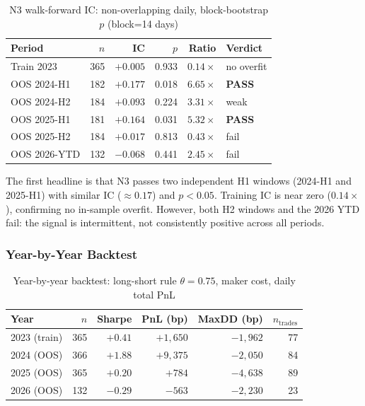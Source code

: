 \documentclass[12pt, a4paper]{article}
\theoremstyle{definition}
\begin{document}
\begin{table}[ht]
\centering
\caption{N3 walk-forward IC: non-overlapping daily, block-bootstrap $p$ (block=14 days)}
\label{tab:n3_walkforward}
\begin{tabular}{lrrrrl}
\toprule
Period & $n$ & IC & $p$ & Ratio & Verdict \\
\midrule
Train 2023     & 365 & $+0.005$ & 0.933 & $0.14\times$ & no overfit \\
OOS 2024-H1    & 182 & $+0.177$ & 0.018 & $6.65\times$ & \textbf{PASS} \\
OOS 2024-H2    & 184 & $+0.093$ & 0.224 & $3.31\times$ & weak \\
OOS 2025-H1    & 181 & $+0.164$ & 0.031 & $5.32\times$ & \textbf{PASS} \\
OOS 2025-H2    & 184 & $+0.017$ & 0.813 & $0.43\times$ & fail \\
OOS 2026-YTD   & 132 & $-0.068$ & 0.441 & $2.45\times$ & fail \\
\bottomrule
\end{tabular}
\end{table}

The first headline is that N3 passes two independent H1 windows
(2024-H1 and 2025-H1) with similar IC ($\approx 0.17$) and $p < 0.05$.
Training IC is near zero ($0.14\times$), confirming no in-sample overfit.
However, both H2 windows and the 2026 YTD fail: the signal is intermittent,
not consistently positive across all periods.

\subsubsection{Year-by-Year Backtest}

\begin{table}[ht]
\centering
\caption{Year-by-year backtest: long-short rule $\theta=0.75$, maker cost, daily total PnL}
\label{tab:n3_yearly}
\begin{tabular}{lrrrrr}
\toprule
Year & $n$ & Sharpe & PnL (bp) & MaxDD (bp) & $n_{\text{trades}}$ \\
\midrule
2023 (train) & 365 & $+0.41$ & $+1{,}650$ & $-1{,}962$ & 77 \\
2024 (OOS)   & 366 & $+1.88$ & $+9{,}375$ & $-2{,}050$ & 84 \\
2025 (OOS)   & 365 & $+0.20$ & $+784$     & $-4{,}638$ & 89 \\
2026 (OOS)   & 132 & $-0.29$ & $-563$     & $-2{,}230$ & 23 \\
\bottomrule
\end{tabular}
\end{table}
\end{document}
